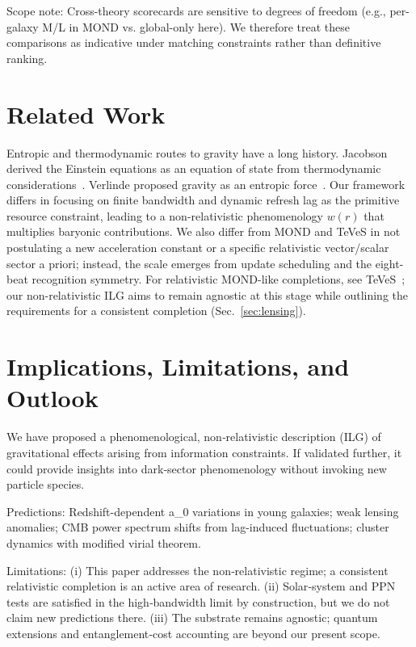 \documentclass[twocolumn,prd,amsmath,amssymb,aps,superscriptaddress,nofootinbib]{revtex4-2}
\begin{document}
Scope note: Cross-theory scorecards are sensitive to degrees of freedom (e.g., per-galaxy M/L in MOND vs. global-only here). We therefore treat these comparisons as indicative under matching constraints rather than definitive ranking.

\section{Related Work}
\label{sec:related}

Entropic and thermodynamic routes to gravity have a long history. Jacobson derived the Einstein equations as an equation of state from thermodynamic considerations~\cite{Jacobson1995}. Verlinde proposed gravity as an entropic force~\cite{Verlinde2011}. Our framework differs in focusing on finite bandwidth and dynamic refresh lag as the primitive resource constraint, leading to a non-relativistic phenomenology $w(r)$ that multiplies baryonic contributions. We also differ from MOND and TeVeS in not postulating a new acceleration constant or a specific relativistic vector/scalar sector a priori; instead, the scale emerges from update scheduling and the eight-beat recognition symmetry. For relativistic MOND-like completions, see TeVeS~\cite{Bekenstein2004TeVeS}; our non-relativistic ILG aims to remain agnostic at this stage while outlining the requirements for a consistent completion (Sec.~\ref{sec:lensing}).

\section{Implications, Limitations, and Outlook}
\label{sec:conclusion}

We have proposed a phenomenological, non‑relativistic description (ILG) of gravitational effects arising from information constraints. If validated further, it could provide insights into dark‑sector phenomenology without invoking new particle species.

Predictions: Redshift-dependent a_0 variations in young galaxies; weak lensing anomalies; CMB power spectrum shifts from lag-induced fluctuations; cluster dynamics with modified virial theorem.

Limitations: (i) This paper addresses the non‑relativistic regime; a consistent relativistic completion is an active area of research. (ii) Solar‑system and PPN tests are satisfied in the high‑bandwidth limit by construction, but we do not claim new predictions there. (iii) The substrate remains agnostic; quantum extensions and entanglement‑cost accounting are beyond our present scope.
\end{document}
